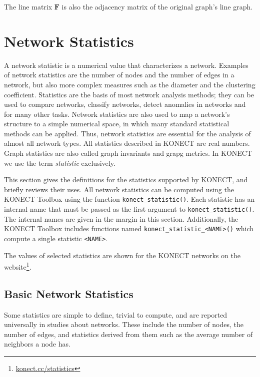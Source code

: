 \documentclass{article}
\begin{document}
The line matrix $\mathbf F$ is also the adjacency matrix of the original
graph's line graph. 

\section{Network Statistics}
\label{sec:statistics}
A network statistic is a numerical value that characterizes a network.
Examples of network statistics are the number of nodes and the number of
edges in a network, but also more complex measures such as the diameter and the
clustering coefficient.  
Statistics are the basis of most network analysis methods; they can be
used to compare networks, classify networks, detect anomalies in
networks and for many other tasks.  Network statistics are also used to
map a network's structure 
to a simple numerical space, in which many standard statistical
methods can be applied.  Thus, network statistics are essential for the
analysis of almost all network types. 
All statistics described in KONECT are real numbers.
Graph statistics are also called graph invariants and grapg metrics.  In
KONECT we use the term \emph{statistic} exclusively. 

This section gives the definitions for the statistics supported by
KONECT, and briefly reviews their uses.  
All network statistics can be computed using the KONECT Toolbox using
the function \texttt{konect\_statistic()}. Each statistic has an
internal name that must be passed as the first argument to
\texttt{konect\_statistic()}.  The internal names are given in the
margin in this section. 
Additionally, the KONECT Toolbox includes functions named
\texttt{konect\_statistic\_<NAME>()} which compute a single statistic
\texttt{<NAME>}. 

The values of selected statistics are
shown for the KONECT networks on the
website\footnote{\href{http://konect.cc/statistics/}{konect.cc/statistics}}.  

\subsection{Basic Network Statistics}
Some statistics are simple to define, trivial to compute, and 
are reported universally in studies about networks.  These include the
number of nodes, the number of edges, and statistics derived from them
such as the average number of neighbors a node has.  
\end{document}
